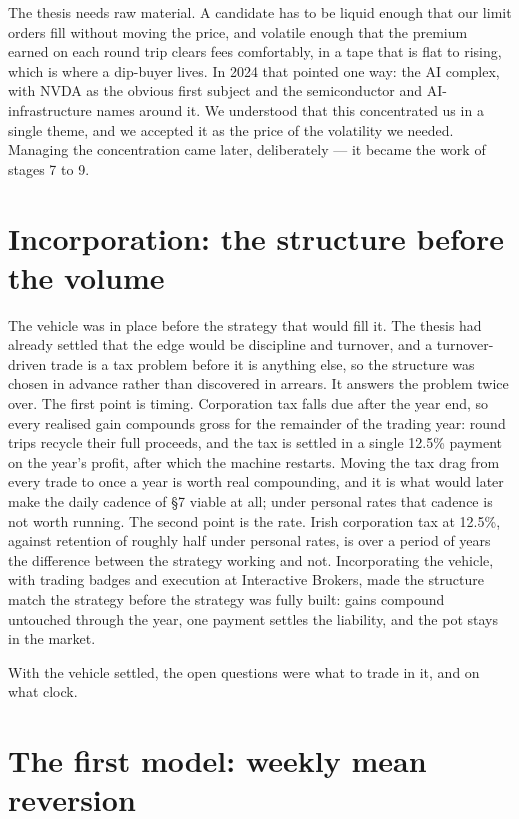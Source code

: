 \documentclass[11pt,a4paper]{article}
\begin{document}
The thesis needs raw material. A candidate has to be liquid enough that our
limit orders fill without moving the price, and volatile enough that the
premium earned on each round trip clears fees comfortably, in a tape that is
flat to rising, which is where a dip-buyer lives. In 2024 that pointed one
way: the AI complex, with NVDA as the obvious first subject and the
semiconductor and AI-infrastructure names around it. We understood that this
concentrated us in a single theme, and we accepted it as the price of the
volatility we needed. Managing the concentration came later, deliberately ---
it became the work of stages 7 to 9.

\section{Incorporation: the structure before the volume}

The vehicle was in place before the strategy that would fill it. The thesis
had already settled that the edge would be discipline and turnover, and a
turnover-driven trade is a tax problem before it is anything else, so the
structure was chosen in advance rather than discovered in arrears. It
answers the problem twice over. The first point is timing. Corporation tax
falls due after the year end, so every realised gain compounds gross for the
remainder of the trading year: round trips recycle their full proceeds, and
the tax is settled in a single 12.5\% payment on the year's profit, after
which the machine restarts. Moving the tax drag from every trade to once a
year is worth real compounding, and it is what would later make the daily
cadence of \S7 viable at all; under personal rates that cadence is not worth
running. The second point is the rate. Irish corporation tax at 12.5\%,
against retention of roughly half under personal rates, is over a period of
years the difference between the strategy working and not. Incorporating the
vehicle, with trading badges and execution at Interactive Brokers, made the
structure match the strategy before the strategy was fully built: gains
compound untouched through the year, one payment settles the liability, and
the pot stays in the market.

With the vehicle settled, the open questions were what to trade in it, and
on what clock.

\section{The first model: weekly mean reversion}
\end{document}
